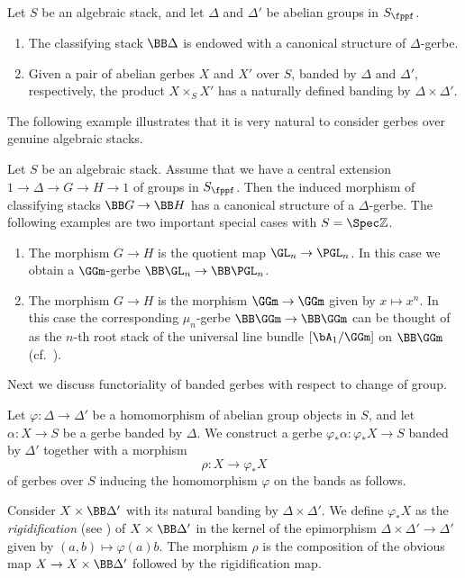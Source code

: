 \begin{example}
\label{ex:simple-gerbes}
Let $S$ be an algebraic stack,
and let $\Delta$ and $\Delta'$ be abelian groups in $S_\fppf$.
\begin{enumerate}
\item
The classifying stack $\BB \Delta$ is endowed with a canonical structure of $\Delta$-gerbe.
\item
Given a pair of abelian gerbes $X$ and $X'$ over $S$,
banded by $\Delta$ and $\Delta'$, respectively,
the product $X\times_S X'$ has a naturally defined banding by $\Delta\times \Delta'$.
\end{enumerate}
\end{example}

The following example illustrates that it is very natural to consider gerbes over
genuine algebraic stacks.
\begin{example}
\label{ex-gerbes}
Let $S$ be an algebraic stack. Assume that we have a central extension
$1 \to \Delta \to G \to H \to 1$ of groups in $S_\fppf$.
Then the induced morphism of classifying stacks $\BB G \to \BB H$
has a canonical structure of a $\Delta$-gerbe.
The following examples are two important special cases with $S = \Spec \mathbb{Z}$.
\begin{enumerate}
\item
\label{it-universal-projective}
The morphism $G \to H$ is the quotient map $\GL_n \to \PGL_n$.
In this case we obtain a $\GGm$-gerbe $\BB\GL_n \to
\BB\PGL_n$.
\item
\label{it-universal-root}
The morphism $G \to H$ is the morphism $\GGm \to \GGm$ given by
$x \mapsto x^n$. 
In this case the corresponding $\mu_n$-gerbe $\BB \GGm \to \BB \GGm$ can be thought
of as the $n$-th root stack of the universal line bundle $[\bA_1/\GGm]$ on $\BB
\GGm$ (cf.~\cite[Definition~2.2.6]{cadman2007}).
\end{enumerate}
\end{example}

Next we discuss functoriality of banded gerbes with respect to change of group.

\begin{construction}
\label{cons-gerbe-pf}
Let $\varphi\colon \Delta \to \Delta'$ be a homomorphism of abelian group objects in $S$,
and let $\alpha\colon X \to S$ be a gerbe banded by $\Delta$.
We construct a gerbe $\varphi_*\alpha\colon \varphi_*  X \to S$
banded by $\Delta'$ together with a morphism
\begin{equation}
\label{eq-gerbe-pf}
\rho \colon X \to \varphi_*X
\end{equation}
of gerbes over $S$ inducing the homomorphism $\varphi$ on the bands as follows.
 
Consider $X \times \BB \Delta'$ with its natural banding by $\Delta \times \Delta'$.
We define $\varphi_*X$ as the \emph{rigidification} (see \cite[Appendix~A]{aov2008})
of $X \times \BB \Delta'$ in the kernel of the epimorphism
$\Delta \times \Delta' \to \Delta'$ given by $(a, b) \mapsto \varphi(a) b$.
The morphism $\rho$ is the composition of the obvious map $X \to X\times \BB \Delta'$ followed by the
rigidification map.
\end{construction}

